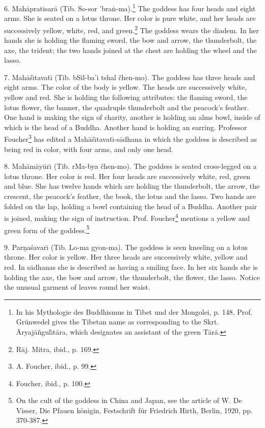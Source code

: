 \documentclass[a4paper, 12pt, oneside]{article}
\begin{document}
6. Mah\={a}pratisar\={a} (Tib. So-sor 'bra\.{n}-ma).\footnote{In his Mythologie des Buddhismus in Tibet und der Mongolei, p. 148, Prof. Grünwedel gives the Tibetan name as corresponding to the Skrt. \={A}ryaj\={a}\~{n}gul\={\i}t\={a}ra, which designates an assistant of the green T\={a}r\={a}.} The goddess has four heads and eight arms. She is seated on a lotus throne. Her color is pure white, and her heads are successively yellow, white, red, and green.\footnote{R\={a}j. Mitra, ibid., p. 169.} The goddess wears the diadem. In her hands she is holding the flaming sword, the bow and arrow, the thunderbolt, the axe, the trident; the two hands joined at the chest are holding the wheel and the lasso.

7. Mah\={a}\'{s}\={\i}tavat\={\i} (Tib. bSil-ba'i tshal čhen-mo). The goddess has three heads and eight arms. The color of the body is yellow. The heads are successively white, yellow and red. She is holding the following attributes: the flaming sword, the lotus flower, the banner, the quadruple thunderbolt and the peacock's feather. One hand is making the sign of charity, another is holding an alms bowl, inside of which is the head of a Buddha. Another hand is holding an earring. Professor Foucher\footnote{A. Foucher, ibid., p. 99.} has edited a Mah\={a}\'{s}\={\i}tavat\={\i}-s\={a}dhana in which the goddess is described as being red in color, with four arms, and only one head.

8. Mah\={a}m\={a}y\={u}r\={\i} (Tib. rMa-bya čhen-mo). The goddess is seated cross-legged on a lotus throne. Her color is red. Her four heads are successively white, red, green and blue. She has twelve hands which are holding the thunderbolt, the arrow, the crescent, the peacock's feather, the book, the lotus and the lasso. Two hands are folded on the lap, holding a bowl containing the head of a Buddha. Another pair is joined, making the sign of instruction. Prof. Foucher\footnote{Foucher, ibid., p. 100.} mentions a yellow and green form of the goddess.\footnote{On the cult of the goddess in China and Japan, see the article of W. De Visser, Die Pfauen königin, Festschrift für Friedrich Hirth, Berlin, 1920, pp. 370-387.}

9. Par\d{n}a\'{s}avar\={\i} (Tib. Lo-ma gyon-ma). The goddess is seen kneeling on a lotus throne. Her color is yellow. Her three heads are successively white, yellow and red. In s\={a}dhanas she is described as having a smiling face. In her six hands she is holding the axe, the bow and arrow, the thunderbolt, the flower, the lasso. Notice the unusual garment of leaves round her waist.
\end{document}
